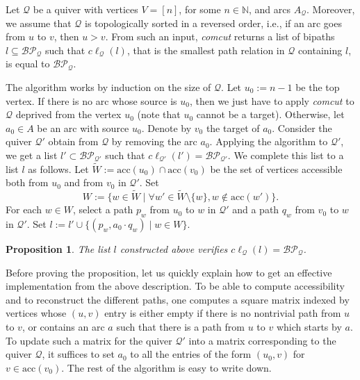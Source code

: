 \documentclass[10pt,a4paper]{article}
\newtheorem{proposition}[theorem]{Proposition}
\newcommand{\ie}{i.e.}
\renewcommand{\~}{\widetilde}
\newcommand{\N}{\mathbb N}
\newcommand{\Q}{\mathcal Q}
\newcommand{\BP}{\mathcal{BP}}
\newcommand{\cl}{c\ell} %
\newcommand{\concat}{\!\cdot\!} %
\newcommand{\acc}{\mathrm{acc}} %
\begin{document}
Let $\Q$ be a quiver with vertices $V=[n]$, for some $n\in\N$, and arcs $A_\Q$. Moreover, we assume that $\Q$ is topologically sorted in a reversed order, \ie, if an arc goes from $u$ to $v$, then $u > v$. From such an input, \emph{comcut} returns a list of bipaths $l \subseteq \BP_\Q$ such that $\cl_\Q(l)$, that is the smallest path relation in $\Q$ containing $l$, is equal to $\BP_\Q$.

The algorithm works by induction on the size of $\Q$. Let $u_0 := n-1$ be the top vertex. If there is no arc whose source is $u_0$, then we just have to apply \emph{comcut} to $\Q$ deprived from the vertex $u_0$ (note that $u_0$ cannot be a target). Otherwise, let $a_0 \in A$ be an arc with source $u_0$. Denote by $v_0$ the target of $a_0$. Consider the quiver $\Q'$ obtain from $\Q$ by removing the arc $a_0$. Applying the algorithm to $\Q'$, we get a list $l' \subset \BP_{\Q'}$ such that $\cl_{\Q'}(l')=\BP_{\Q'}$. We complete this list to a list $l$ as follows. Let $\~W := \acc(u_0)\cap\acc(v_0)$ be the set of vertices accessible both from $u_0$ and from $v_0$ in $\Q'$. Set
\[ W := \{ w \in \~W \mid \forall w'\in\~W\setminus\{w\}, w \notin \acc(w') \}. \]
For each $w \in W$, select a path $p_w$ from $u_0$ to $w$ in $\Q'$ and a path $q_w$ from $v_0$ to $w$ in $\Q'$. Set $l := l' \cup \{ (p_w, a_0 \concat q_w) \mid w \in W \}$.


\begin{proposition}
  The list $l$ constructed above verifies $\cl_\Q(l) = \BP_\Q$.
\end{proposition}


Before proving the proposition, let us quickly explain how to get an effective implementation from the above description. To be able to compute accessibility and to reconstruct the different paths, one computes a square matrix indexed by vertices whose $(u,v)$ entry is either empty if there is no nontrivial path from $u$ to $v$, or contains an arc $a$ such that there is a path from $u$ to $v$ which starts by $a$. To update such a matrix for the quiver $\Q'$ into a matrix corresponding to the quiver $\Q$, it suffices to set $a_0$ to all the entries of the form $(u_0,v)$ for $v \in \acc(v_0)$. The rest of the algorithm is easy to write down.
\end{document}
